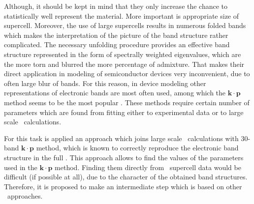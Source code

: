 Although, it should be kept in mind that they only increase the chance to statistically well represent the material.
More important is appropriate size of supercell.
Moreover, the use of large supercells results in numerous folded bands which makes the interpretation of the picture of the band structure rather complicated.
The necessary unfolding procedure \cite{unfolding} provides an effective band structure represented in the form of spectrally weighted eigenvalues, which are the more torn and blurred the more percentage of admixture.
That makes their direct application in modeling of semiconductor devices very inconvenient, due to often large blur of bands.
For this reason, in device modeling other representations of electronic bands are most often used, among which the $\mathbf{k}\cdot\mathbf{p}$ method seems to be the most popular \cite{richard05, kurdi10, gladysiewicz13, gladysiewicz14, maczko19}.
These methods require certain number of parameters which are found from fitting either to experimental data or to large scale \abinitio\ calculations.

For this task is applied an approach which joins large scale \abinitio\ calculations with 30-band $\mathbf{k}\cdot\mathbf{p}$ method, which is known to correctly reproduce the electronic band structure in the full \BZ.
This approach allows to find the values of the parameters used in the $\mathbf{k}\cdot\mathbf{p}$ method.
Finding them directly from \abinitio\ supercell data would be difficult (if possible at all), due to the character of the obtained band structures.
Therefore, it is proposed to make an intermediate step which is based on other \abinitio\ approaches.

